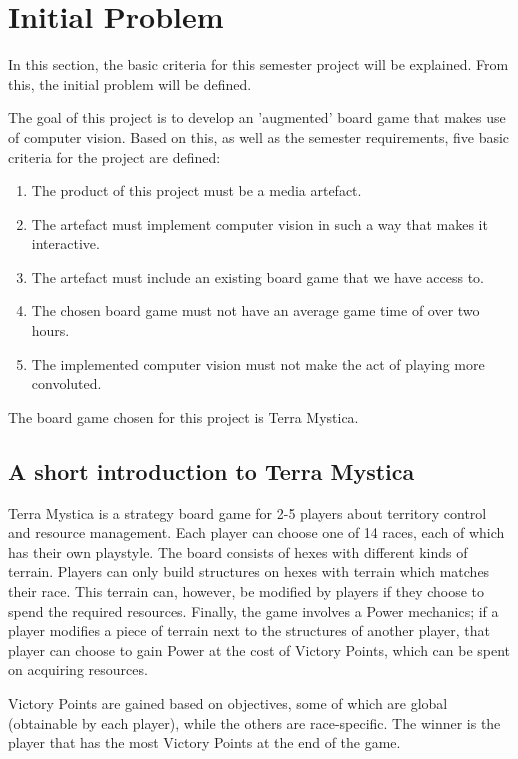 \chapter{Initial Problem}\label{ch:iniprob}
In this section, the basic criteria for this semester project will be explained. From this, the initial problem will be defined.

The goal of this project is to develop an 'augmented' board game that makes use of computer vision. Based on this, as well as the semester requirements, five basic criteria for the project are defined:

\begin{enumerate}
	\item The product of this project must be a media artefact.
	\item The artefact must implement computer vision in such a way that makes it interactive.
	\item The artefact must include an existing board game that we have access to.
	\item The chosen board game must not have an average game time of over two hours.
	\item The implemented computer vision must not make the act of playing more convoluted.
\end{enumerate}

The board game chosen for this project is Terra Mystica.

\section{A short introduction to Terra Mystica}
Terra Mystica is a strategy board game for 2-5 players about territory control and resource management. Each player can choose one of 14 races, each of which has their own playstyle. The board consists of hexes with different kinds of terrain. Players can only build structures on hexes with terrain which matches their race. This terrain can, however, be modified by players if they choose to spend the required resources. Finally, the game involves a Power mechanics; if a player modifies a piece of terrain next to the structures of another player, that player can choose to gain Power at the cost of Victory Points, which can be spent on acquiring resources.  

Victory Points are gained based on objectives, some of which are global (obtainable by each player), while the others are race-specific. The winner is the player that has the most Victory Points at the end of the game.

